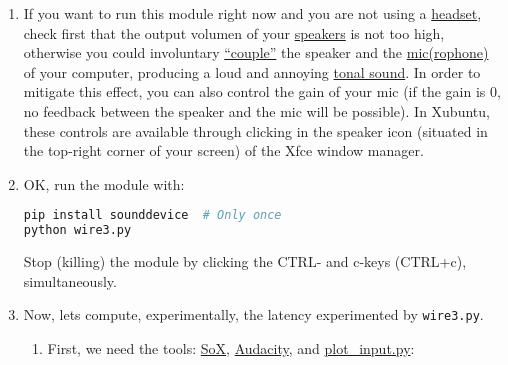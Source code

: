 \begin{enumerate}
\item If you want to run this module right now and you are not using a
  \href{https://en.wikipedia.org/wiki/Headset_(audio)}{headset}, check
  first that the output volumen of your
  \href{https://en.wikipedia.org/wiki/Headset_(audio)}{speakers} is
  not too high, otherwise you could involuntary
  \href{https://www.youtube.com/watch?v=rI90lhYAffo}{``couple''} the
  speaker and the
  \href{https://en.wikipedia.org/wiki/Microphone}{mic(rophone)} of
  your computer, producing a loud and annoying
  \href{https://www.cirrusresearch.co.uk/blog/2012/03/tonal-noise-analysis-with-the-optimus-green-sound-level-meters/}{tonal
    sound}. In order to mitigate this
  effect, you can also control the gain of your mic (if the
  gain is 0, no feedback between the speaker and the mic will be
  possible). In Xubuntu, these controls are available through clicking in
  the speaker icon (situated in the top-right corner of your screen)
  of the Xfce window manager.

\item OK, run the module with:

  \begin{lstlisting}[language=Bash]
pip install sounddevice  # Only once
python wire3.py
  \end{lstlisting}

  Stop (killing) the module by clicking the CTRL- and c-keys (CTRL+c),
  simultaneously.


\item Now, lets compute, experimentally, the latency experimented by
  \texttt{wire3.py}.

  \begin{enumerate} \item First, we need the
  tools: \href{http://sox.sourceforge.net/}{SoX}, \href{https://www.audacityteam.org/}{Audacity},
  and \href{https://raw.githubusercontent.com/Tecnologias-multimedia/intercom/master/test/sounddevice/plot_input.py}{plot\_input.py}:
  

\end{enumerate}
\end{enumerate}
